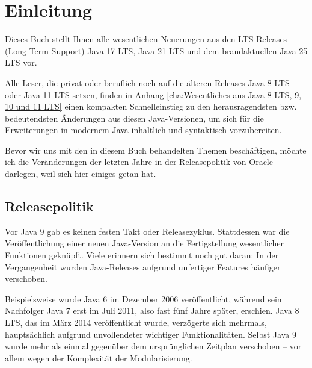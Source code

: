 
\chapter{Einleitung}


Dieses Buch stellt Ihnen alle wesentlichen Neuerungen aus den LTS-Releases
(Long Term Support)
Java 17 LTS, Java 21 LTS und dem brandaktuellen Java 25 LTS vor.


Alle Leser, die privat oder beruflich noch auf die älteren Releases
Java 8 LTS oder Java 11 LTS setzen, finden in Anhang \ref{cha:Wesentliches aus Java 8 LTS, 9, 10 und 11 LTS}
einen kompakten Schnelleinstieg
zu den heraus\-ragendsten bzw. bedeutendsten Änderungen aus diesen  Java-Versionen,
um sich für die Erweiterungen in modernem Java inhaltlich und syntaktisch vorzubereiten.


Bevor wir uns mit den in diesem Buch behandelten Themen beschäftigen,
möchte ich die Veränderungen der letzten Jahre in der Releasepolitik von Oracle
darlegen, weil sich hier einiges getan hat.




\section{Releasepolitik}


Vor Java 9 gab es keinen festen Takt oder Releasezyklus.
Stattdessen war die Veröffentlichung einer neuen Java-Version an die Fertigstellung
wesentlicher Funktionen geknüpft. Viele erinnern sich bestimmt noch gut daran:
 In der Vergangenheit wurden Java-Releases aufgrund unfertiger Features häufiger verschoben.


Beispielsweise wurde Java 6 im Dezember 2006 veröffentlicht, während sein Nachfolger Java 7
erst im Juli 2011, also fast fünf Jahre später, erschien. Java 8 LTS, das im März 2014 veröffentlicht
wurde, verzögerte sich mehrmals, hauptsächlich aufgrund unvollendeter wichtiger Funktionalitäten.
Selbst Java 9 wurde mehr als einmal gegenüber dem ursprünglichen Zeitplan verschoben --
vor allem wegen der Komplexität der Modularisierung.


